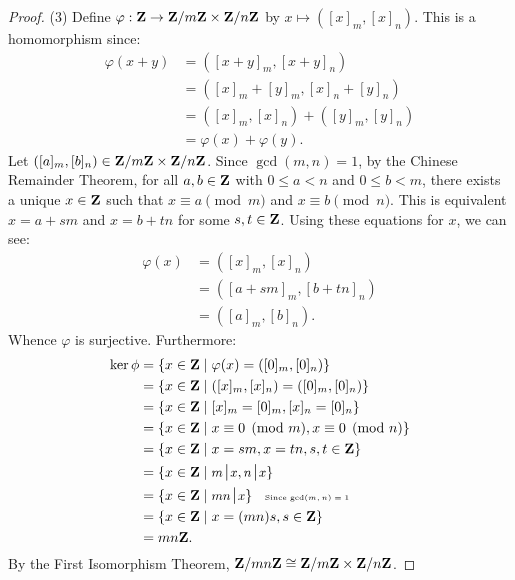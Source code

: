 \documentclass[11pt,twoside,openany]{memoir}
\begin{document}
{\begin{proof}
            \noindent (3) Define $\varphi : \mathbf{Z} \rightarrow \mathbf{Z}/m\mathbf{Z} \times \mathbf{Z}/n\mathbf{Z}$ by $x \mapsto ([x]_m,[x]_n)$. This is a homomorphism since:
                \begin{equation*}
                \begin{split}
                    \varphi(x+y)
                    & = ([x+y]_m,[x+y]_n) \\
                    & = ([x]_m + [y]_m,[x]_n + [y]_n) \\
                    & = ([x]_m,[x]_n) + ([y]_m,[y]_n) \\
                    & = \varphi(x) + \varphi(y).
                \end{split}
                \end{equation*}
            Let $([a]_m,[b]_n) \in \mathbf{Z}/m\mathbf{Z} \times \mathbf{Z}/n\mathbf{Z}$. Since $\gcd(m,n)=1$, by the Chinese Remainder Theorem, for all $a,b \in \mathbf{Z}$ with $0 \leq a < n$ and $0 \leq b < m$, there exists a unique $x \in \mathbf{Z}$ such that $x \equiv a \pmod{m}$ and $x \equiv b \pmod{n}$. This is equivalent $x = a + sm$ and $x = b + tn$ for some $s,t \in \mathbf{Z}$. Using these equations for $x$, we can see:
                \begin{equation*}
                \begin{split}
                    \varphi(x)
                    & = ([x]_m,[x]_n) \\
                    & = ([a+sm]_m,[b+tn]_n) \\
                    & = ([a]_m,[b]_n).
                \end{split}
                \end{equation*}
            Whence $\varphi$ is surjective. Furthermore:
                \begin{equation*}
                \begin{split}
                    \ker \phi 
                    & = \{x \in \bfZ \mid \varphi(x) = ([0]_m,[0]_n) \} \\
                    & = \{x \in \bfZ \mid ([x]_m,[x]_n) = ([0]_m,[0]_n)\} \\
                    & = \{x \in \bfZ \mid [x]_m = [0]_m, [x]_n = [0]_n\} \\
                    & = \{x \in \bfZ \mid x \equiv 0\pmod{m}, x \equiv 0 \pmod{n} \} \\
                    & = \{x \in \bfZ \mid x = sm, x = tn, s,t \in \bfZ \} \\
                    & = \{x \in \bfZ \mid \div{m}{x}, \div{n}{x} \} \\
                    & = \{x \in \bfZ \mid \div{mn}{x} \} \h9\text{\tiny Since $\gcd(m,n) = 1$} \\
                    & = \{x \in \bfZ \mid x = (mn)s, s \in \bfZ\} \\
                    & = mn\bfZ.
                \end{split}
                \end{equation*}
            By the First Isomorphism Theorem, $\mathbf{Z}/mn\mathbf{Z} \cong \mathbf{Z}/m\mathbf{Z} \times \mathbf{Z}/n\mathbf{Z}$.
        \end{proof}}
\end{document}
